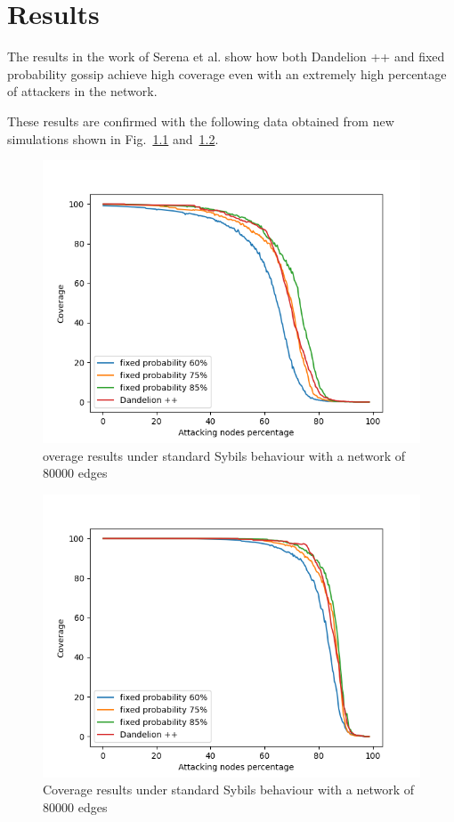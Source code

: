 \chapter{Results}
\label{sec:res}

The results in the work of Serena et al. show how both Dandelion ++ and fixed probability gossip achieve high coverage even with an extremely high percentage of attackers in the network\cite{lunes-dissemination}.

These results are confirmed with the following data obtained from new simulations shown in Fig.~\ref{fig:noatk40} and~\ref{fig:notatk80}.\par

\begin{figure}[h]
	\includegraphics[width=.8\textwidth]{pict/results/noatk-40.png}
	\centering 
	\caption{overage results under standard Sybils behaviour with a network of 80000 edges}
	\label{fig:noatk40}
\end{figure}
\begin{figure}[h]
	\includegraphics[width=.8\textwidth]{pict/results/noatk-80.png}
	\centering 
	\caption{Coverage results under standard Sybils behaviour with a network of 80000 edges}
	\label{fig:notatk80}
\end{figure}

